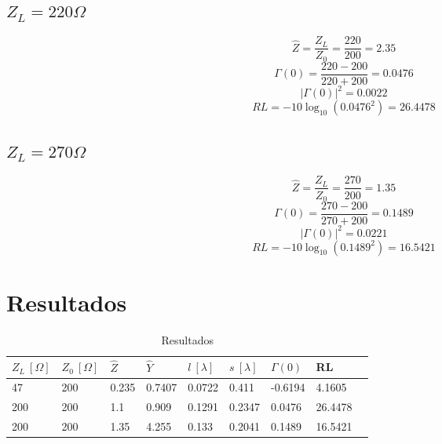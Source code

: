 \documentclass[12pt,letterpaper]{article}
\begin{document}
\subsection{$Z_L=220 \Omega$}
\begin{equation}
    \hat{Z}=\frac{Z_L}{Z_0}=\frac{220}{200}=2.35
\end{equation}
\begin{equation}
    \Gamma(0)=\frac{220-200}{220+200}=0.0476
\end{equation}
\begin{equation}
    |\Gamma(0)|^{2}=0.0022
\end{equation}
\begin{equation}
    RL=-10\log_{10} (0.0476^{2})=26.4478
\end{equation}

\subsection{$Z_L=270 \Omega$}
\begin{equation}
    \hat{Z}=\frac{Z_L}{Z_0}=\frac{270}{200}=1.35
\end{equation}
\begin{equation}
    \Gamma(0)=\frac{270-200}{270+200}=0.1489
\end{equation}
\begin{equation}
    |\Gamma(0)|^{2}=0.0221
\end{equation}
\begin{equation}
    RL=-10\log_{10} (0.1489^{2})=16.5421
\end{equation}

\section{Resultados}
\begin{table}[ht]
    \centering
    \begin{tabular}{|l|l|l|l|l|l|l|l|l|}
    \hline
    $Z_L \ [\Omega] $ & $Z_0 \ [\Omega] $ & $\hat{Z}$ & $\hat{Y}$ & $l \ [\lambda] $ & $s \ [\lambda] $ & $\Gamma(0)$ & RL \\ \hline
    47 & 200 & 0.235 & 0.7407 & 0.0722 & 0.411 & -0.6194 & 4.1605 \\ \hline
    200 & 200 & 1.1 & 0.909 & 0.1291 & 0.2347 & 0.0476 & 26.4478  \\ \hline
    200 & 200 & 1.35 & 4.255 & 0.133 & 0.2041 & 0.1489 & 16.5421  \\ \hline
    \end{tabular}
    \caption{Resultados}
    \label{my-label}
\end{table}
\end{document}

